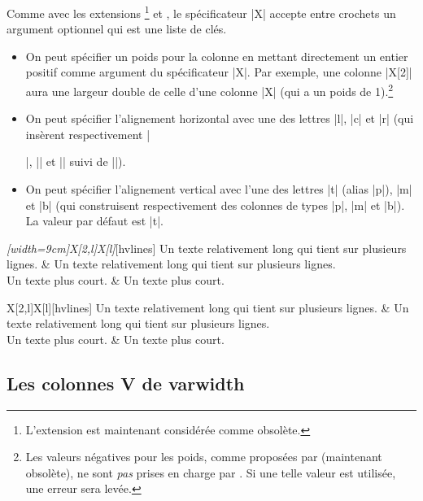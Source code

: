 \documentclass[dvipsnames]{article}%
\begin{document}
Comme avec les extensions \footnote{L'extension  est
  maintenant considérée comme obsolète.} et , le spécificateur |X|
accepte entre crochets un argument optionnel qui est une liste de clés.
\begin{itemize}
\item On peut spécifier un poids pour la colonne en mettant directement un
entier positif comme argument du spécificateur |X|. Par exemple, une colonne
|X[2]| aura une largeur double de celle d'une colonne |X| (qui a un poids de
1).\footnote{Les valeurs négatives pour les poids, comme proposées par
   (maintenant obsolète), ne sont \emph{pas} prises en charge par
  . Si une telle valeur est utilisée, une erreur sera levée.}
\item On peut spécifier l'alignement horizontal avec une des lettres |l|, |c| et
|r| (qui insèrent respectivement |\raggedright|, |\centering| et |\raggedleft|
suivi de |\arraybackslash|).
\item On peut spécifier l'alignement vertical avec l'une des lettres |t| (alias
|p|), |m| et |b| (qui construisent respectivement des colonnes de types |p|, |m|
et |b|). La valeur par défaut est |t|.
\end{itemize}

\begin{Code}
\begin{NiceTabular}\emph{[width=9cm]{X[2,l]X[l]}}[hvlines]
Un texte relativement long qui tient sur plusieurs lignes. &
Un texte relativement long qui tient sur plusieurs lignes. \\
Un texte plus court. & Un texte plus court.
\end{NiceTabular}
\end{Code}


\begin{center}
\begin{NiceTabular}[width=9cm]{X[2,l]X[l]}[hvlines]
Un texte relativement long qui tient sur plusieurs lignes. &
Un texte relativement long qui tient sur plusieurs lignes. \\
Un texte plus court. & Un texte plus court.
\end{NiceTabular}
\end{center}

\subsection{Les colonnes V de varwidth}

\label{varwidth}
\end{document}
